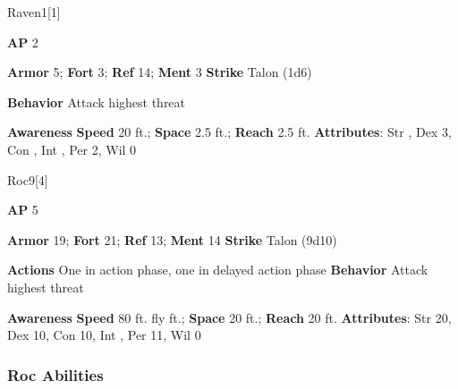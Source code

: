 \begin{monsection}{Raven}{1}[1]
\vspace{-1em}\vspace{-1em}
\begin{spellcontent}
\begin{spelltargetinginfo}
{\textbf{AP} 2}

\pari \textbf{Armor} 5;
\textbf{Fort} 3;
\textbf{Ref} 14;
\textbf{Ment} 3
\pari \textbf{Strike} Talon  (1d6)



\pari \textbf{Behavior} Attack highest threat
\end{spelltargetinginfo}
\end{spellcontent}

\begin{monsterfooter}
\pari \textbf{Awareness} 
\pari \textbf{Speed} 20 ft.;
\textbf{Space} 2.5 ft.;
\textbf{Reach} 2.5 ft.
\pari \textbf{Attributes}:
Str ,
Dex 3,
Con ,
Int ,
Per 2,
Wil 0
\end{monsterfooter}
\end{monsection}

\begin{monsection}{Roc}{9}[4]
\vspace{-1em}\vspace{-1em}
\begin{spellcontent}
\begin{spelltargetinginfo}
{\textbf{AP} 5}

\pari \textbf{Armor} 19;
\textbf{Fort} 21;
\textbf{Ref} 13;
\textbf{Ment} 14
\pari \textbf{Strike} Talon  (9d10)


\pari \textbf{Actions} One in action phase, one in delayed action phase
\pari \textbf{Behavior} Attack highest threat
\end{spelltargetinginfo}
\end{spellcontent}

\begin{monsterfooter}
\pari \textbf{Awareness} 
\pari \textbf{Speed} 80 ft. fly ft.;
\textbf{Space} 20 ft.;
\textbf{Reach} 20 ft.
\pari \textbf{Attributes}:
Str 20,
Dex 10,
Con 10,
Int ,
Per 11,
Wil 0
\end{monsterfooter}
\end{monsection}


\subsubsection{Roc Abilities}

